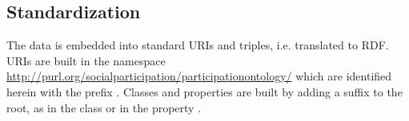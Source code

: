 																																																																																																																																																																																																																																																																																																																																																																																																															\subsection{Standardization}
																																																																																																																																																																																																																																																																																																																																																																																																															The data is embedded into standard URIs and triples, i.e. translated to RDF.
																																																																																																																																																																																																																																																																																																																																																																																																															URIs are built in the namespace \url{http://purl.org/socialparticipation/participationontology/}
																																																																																																																																																																																																																																																																																																																																																																																																															which are identified herein with the prefix .
																																																																																																																																																																																																																																																																																																																																																																																																															Classes and properties are built by adding a suffix to the root,
																																																																																																																																																																																																																																																																																																																																																																																																															as in the class  or in the property .
